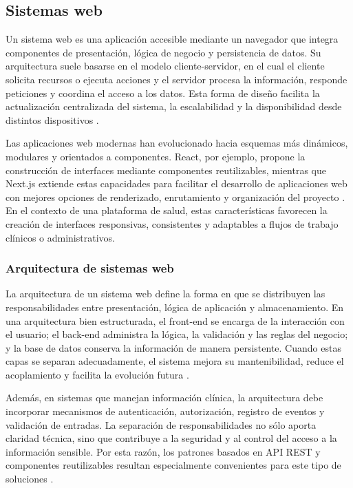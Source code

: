 \subsection{Sistemas web}

Un sistema web es una aplicación accesible mediante un navegador que integra componentes de presentación, lógica de negocio y persistencia de datos. Su arquitectura suele basarse en el modelo cliente-servidor, en el cual el cliente solicita recursos o ejecuta acciones y el servidor procesa la información, responde peticiones y coordina el acceso a los datos. Esta forma de diseño facilita la actualización centralizada del sistema, la escalabilidad y la disponibilidad desde distintos dispositivos \cite{nextjs2025docs,nodejs2025docs,hono2025docs}.

Las aplicaciones web modernas han evolucionado hacia esquemas más dinámicos, modulares y orientados a componentes. React, por ejemplo, propone la construcción de interfaces mediante componentes reutilizables, mientras que Next.js extiende estas capacidades para facilitar el desarrollo de aplicaciones web con mejores opciones de renderizado, enrutamiento y organización del proyecto \cite{react2025docs,nextjs2025docs}. En el contexto de una plataforma de salud, estas características favorecen la creación de interfaces responsivas, consistentes y adaptables a flujos de trabajo clínicos o administrativos.

\subsubsection{Arquitectura de sistemas web}

La arquitectura de un sistema web define la forma en que se distribuyen las responsabilidades entre presentación, lógica de aplicación y almacenamiento. En una arquitectura bien estructurada, el front-end se encarga de la interacción con el usuario; el back-end administra la lógica, la validación y las reglas del negocio; y la base de datos conserva la información de manera persistente. Cuando estas capas se separan adecuadamente, el sistema mejora su mantenibilidad, reduce el acoplamiento y facilita la evolución futura \cite{hono2025docs,nextjs2025docs,nodejs2025docs}.

Además, en sistemas que manejan información clínica, la arquitectura debe incorporar mecanismos de autenticación, autorización, registro de eventos y validación de entradas. La separación de responsabilidades no sólo aporta claridad técnica, sino que contribuye a la seguridad y al control del acceso a la información sensible. Por esta razón, los patrones basados en API REST y componentes reutilizables resultan especialmente convenientes para este tipo de soluciones \cite{hono2025docs,owasp2025top10,mdn2025security}.

